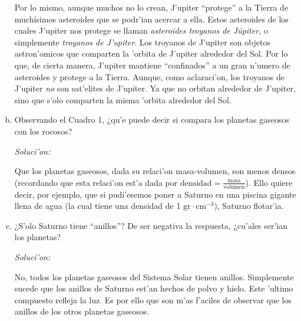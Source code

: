 \documentclass{article}
\newenvironment{myfont}{\fontfamily{pnc}\selectfont}{\par}
\begin{document}
\begin{enumerate}[a)]
Por lo mismo, aunque muchos no lo crean, J'upiter ``protege'' \hfill \break a 
la Tierra de muchísimos asteroides que se podr'ian acercar \hfill \break a ella. 
Estos asteroides de los cuales J'upiter nos protege se \hfill \break llaman 
\emph{asteroides troyanos de Júpiter}, o simplemente \hfill \break \emph{troyanos de J'upiter}.
Los troyanos de J'upiter son objetos \hfill \break astron'omicos que comparten
la 'orbita de J'upiter alrededor \hfill \break del Sol. Por lo que, de cierta  
manera, J'upiter mantiene \hfill \break ``confinados'' a un gran n'umero de 
asteroides y protege a la \hfill \break  Tierra. Aunque, como aclaraci'on, los  
troyanos de J'upiter \emph{no} \hfill \break son sat'elites de J'upiter. Ya que no orbitan
alrededor de \hfill \break J'upiter, sino que s'olo comparten la misma 'orbita alrededor \hfill \break del Sol.

\newpage

\begin{myfont}\item Observando el Cuadro 1, ¿qu'e puede decir si compara los planetas gaseosos con los rocosos? \end{myfont}

\emph{Soluci'on:}

Que los planetas gaseosos, dada su relaci'on masa-volumen, son menos densos (recordando que esta relaci'on est'a dada por $\text{densidad} = \frac{\text{masa}}{\text{volumen}}$). Ello quiere decir, por ejemplo, que si pudi'esemos poner a Saturno en una piscina gigante llena de agua (la cual tiene una densidad de 1 $\text{gr} \cdot \text{cm}^{-3}$), Saturno flotar'ia.


\item \begin{myfont}¿S'olo Saturno tiene ``anillos''? De ser negativa la respuesta, ¿cu'ales ser'ian los planetas? \end{myfont}

\emph{Soluci'on:}

No, todos los planetas gaseosos del Sistema Solar tienen anillos. Simplemente sucede que los anillos de Saturno est'an hechos de polvo y hielo. Este 'ultimo compuesto refleja la luz. Es por ello que son m'as f'aciles de observar que los anillos de los otros planetas gaseosos.
\end{enumerate}
\end{document}
